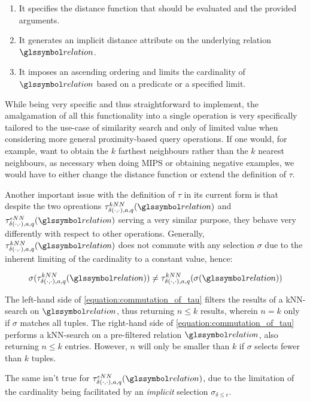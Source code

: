 \begin{enumerate}
    \item It specifies the distance function that should be evaluated and the provided arguments.
    \item It generates an implicit distance attribute on the underlying relation $\relation$.
    \item It imposes an ascending ordering and limits the cardinality of $\relation$ based on a predicate or a specified limit.
\end{enumerate}

While being very specific and thus straightforward to implement, the amalgamation of all this functionality into a single operation is very specifically tailored to the use-case of similarity search and only of limited value when considering more general proximity-based query operations. If one would, for example, want to obtain the $k$ farthest neighbours rather than the $k$ nearest neighbours, as necessary when doing MIPS or obtaining negative examples, we would have to either change the distance function or extend the definition of $\tau$. 

Another important issue with the definition of $\tau$ in its current form is that despite the two opreations $\tau^{kNN}_{\delta(\cdot,\cdot),a,q}(\relation)$ and $\tau^{\epsilon NN}_{\delta(\cdot,\cdot),a,q}(\relation)$ serving a very similar purpose, they behave very differently with respect to other operations. Generally, $\tau^{kNN}_{\delta(\cdot,\cdot),a,q}(\relation)$ does not commute with any selection $\sigma$ due to the inherent limiting of the cardinality to a constant value, hence:

\begin{equation}
    \label{equation:commutation_of_tau}
    \sigma(\tau^{kNN}_{\delta(\cdot,\cdot),a,q}(\relation)) \neq \tau^{kNN}_{\delta(\cdot,\cdot),a,q}(\sigma(\relation))
\end{equation}

The left-hand side of \cref{equation:commutation_of_tau} filters the results of a kNN-search on $\relation$, thus returning $n \leq k$ results, wherein $n = k$ only if $\sigma$ matches all tuples. The right-hand side of \cref{equation:commutation_of_tau} performs a kNN-search on a pre-filtered relation $\relation$, also returning $n \leq k$ entries. However, $n$ will only be smaller than $k$ if $\sigma$ selects fewer than $k$ tuples.

The same isn't true for $\tau^{\epsilon NN}_{\delta(\cdot,\cdot),a,q}(\relation)$, due to the limitation of the cardinality being facilitated by an \emph{implicit} selection $\sigma_{\delta \leq \epsilon}$.

